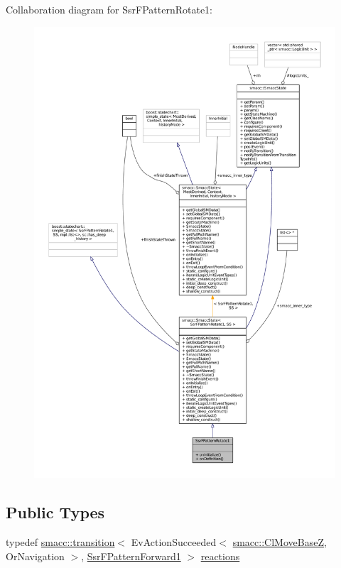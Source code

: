 Collaboration diagram for Ssr\+F\+Pattern\+Rotate1\+:
\nopagebreak
\begin{figure}[H]
\begin{center}
\leavevmode
\includegraphics[width=350pt]{structSsrFPatternRotate1__coll__graph}
\end{center}
\end{figure}
\subsection*{Public Types}
\begin{DoxyCompactItemize}
\item 
typedef \hyperlink{classsmacc_1_1transition}{smacc\+::transition}$<$ Ev\+Action\+Succeeded$<$ \hyperlink{classsmacc_1_1ClMoveBaseZ}{smacc\+::\+Cl\+Move\+BaseZ}, Or\+Navigation $>$, \hyperlink{structSsrFPatternForward1}{Ssr\+F\+Pattern\+Forward1} $>$ \hyperlink{structSsrFPatternRotate1_a9525313b5aaa3d32678446231617e83e}{reactions}
\end{DoxyCompactItemize}

